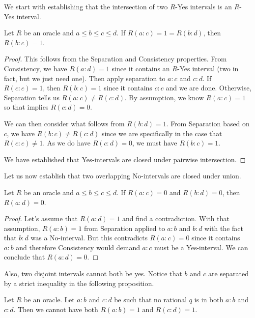 \documentclass[12pt]{article}
\begin{document}
We start with establishing that the intersection of two $R$-Yes intervals is an $R$-Yes interval.

\begin{proposition}\label{pr:inter}
Let $R$ be an oracle and $a \leq b \leq c \leq d$. If $R(a:c) = 1 = R(b:d)$, then $R(b:c) = 1$.
\end{proposition}

\begin{proof}
  
  This follows from the Separation and Consistency properties. From Consistency, we have $R(a:d) = 1$ since it contains an $R$-Yes interval (two in fact, but we just need one). Then apply separation to $a:c$ and $c:d$. If $R(c:c) = 1$, then $R(b:c) = 1$ since it contains $c:c$ and we are done. Otherwise, Separation tells us $R(a:c) \neq R(c:d)$. By assumption, we know $R(a:c) = 1$ so that implies $R(c:d) = 0$. 
  
  We can then consider what follows from $R(b:d) = 1$.  From Separation based on $c$, we have $R(b:c) \neq R(c:d)$ since we are specifically in the case that $R(c:c) \neq 1$. As we do have $R(c:d) = 0$, we must have $R(b:c) = 1$.
  
  We have established that Yes-intervals are closed under pairwise intersection. 
\end{proof}


Let us now establish that two overlapping No-intervals are closed under union. 

\begin{proposition}\label{pr:union}
Let $R$ be an oracle and $a \leq b \leq c \leq d$.  If $R(a:c) = 0$ and $R(b:d) = 0$, then $R(a:d) = 0$. 
\end{proposition}

\begin{proof}
    Let's assume that $R(a:d) = 1$ and find a contradiction. With that assumption, $R(a:b) = 1$ from Separation applied to $a:b$ and $b:d$ with the fact that $b:d$ was a No-interval. But this contradicts $R(a:c)= 0$ since it contains $a:b$ and therefore Consistency would demand $a:c$ must be a Yes-interval. We can conclude that $R(a:d) =0$.
\end{proof}

Also, two disjoint intervals cannot both be yes. Notice that $b$ and $c$ are separated by a strict inequality in the following proposition. 

\begin{proposition} \label{pr:disjoint}
Let $R$ be an oracle. Let $a:b$ and $c:d$ be such that no rational $q$ is in both $a:b$ and $c:d$. Then we cannot have both $R(a:b) = 1$ and $R(c:d) = 1$. 
\end{proposition}
\end{document}
